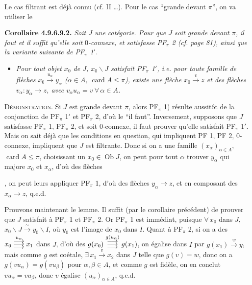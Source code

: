 \documentclass[11pt]{article}
\newcommand{\printedpage}[1]{\marginpar{\footnotesize p.~#1}}
\newcommand{\msp}[1]{\marginpar{\footnotesize [#1]}}
\newcommand{\Ob}{\operatorname{Ob}}
\newcommand{\card}{\operatorname{card}}
\newcommand{\trois}[1]{\mathrel{\overset{#1}{\vcenter{\offinterlineskip\hbox{$\longrightarrow$}\vskip0.5pt\hbox{$\longrightarrow$}\vskip0.5pt\hbox{$\longrightarrow$}}}}}
\begin{document}
\printedpage{89}

Le cas filtrant est déjà connu (cf. II \dots). Pour le cas “grande devant $\pi$”, on va utiliser le

\textbf{Corollaire 4.9.6.9.2.} \textit{Soit $J$ une catégorie. Pour que $J$ soit grande devant $\pi$, il}
\msp{page 238}
\textit{faut et il suffit qu'elle soit $0$-connexe, et satisfasse PF$_\pi$ 2 (cf. page 81), ainsi que la variante suivante de PF$_\pi$ 1$'$.}
\begin{itemize}[leftmargin=4em]
\item[\textit{PF$_\pi$ 1)}] \textit{Pour tout objet $x_0$ de $J$, $x_0\backslash J$ satisfait PF$_\pi$ 1$'$, i.e. pour toute famille de flèches $x_0 \xrightarrow{u_\alpha} y_\alpha$ ($\alpha \in A$, $\card A \leqslant \pi$), existe une flèche $x_0 \xrightarrow{v} z$ et des flèches $v_\alpha : y_\alpha \longrightarrow z$, avec $v_\alpha u_\alpha = v \ \forall\, \alpha \in A$.}
\end{itemize}

\textsc{Démonstration}. Si $J$ est grande devant $\pi$, alors PF$_\pi$ 1) résulte aussitôt de la conjonction de PF$_\pi$ 1$'$ et PF$_\pi$ 2, d'où le “il faut”. Inversement, supposons que $J$ satisfasse PF$_\pi$ 1, PF$_\pi$ 2, et soit 0-connexe, il faut prouver qu'elle satisfait PF$_\pi$ 1$'$. Mais on sait déjà que les conditions en question, qui impliquent PF 1, PF 2, 0-connexe, impliquent que $J$ est filtrante. Donc si on a une famille $(x_\alpha)_{\alpha\in A}$, $\card A \leqslant \pi$, choisissant un $x_0 \in \Ob J$, on peut pour tout $\alpha$ trouver $y_\alpha$ qui majore $x_0$ et $x_\alpha$, d'où des flèches
, on peut leurs appliquer PF$_\pi$ 1, d'où des flèches $y_\alpha \longrightarrow z$, et en composant des $x_\alpha \longrightarrow z$, q.e.d. %

Prouvons maintenant le lemme. Il suffit (par le corollaire précédent) de prouver que $J$ satisfait à PF$_\pi$ 1 et PF$_\pi$ 2. Or PF$_\pi$ 1 est immédiat, puisque $\forall\, x_0$ dans $J$, $x_0\backslash J \xrightarrow{\ \sim\ } y_0\backslash I$, où $y_0$ est
\msp{page 239}
l'image de $x_0$ dans $I$. Quant à PF$_\pi$ 2, si on a des $x_0 \trois{u_\alpha} x_1$ dans $J$, d'où des $g(x_0) \trois{g(u_\alpha)} g(x_1)$, on égalise dans $I$ par $g(x_1) \xrightarrow{w} y$, mais comme $g$ est coétale, $\exists\, x_1 \xrightarrow{v} x_2$ dans $J$ telle que $g(v) = w$, donc on a $g(vu_\alpha) = g(vu_\beta)$ pour $\alpha, \beta \in A$, et comme $g$ est fidèle, on en conclut $vu_\alpha = vu_\beta$, donc $v$ égalise $(u_\alpha)_{\alpha\in A}$, q.e.d.
\end{document}
